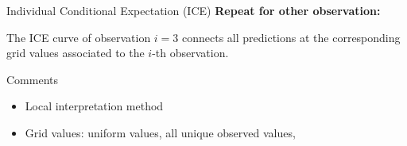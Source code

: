 \documentclass[11pt,compress,t,notes=noshow, xcolor=table]{beamer}
\begin{document}
\begin{vbframe}{Individual Conditional Expectation (ICE)}
\textbf{Repeat for other observation:}

The ICE curve of observation $i=3$ connects all predictions at the corresponding grid values associated to the $i$-th observation.
\end{vbframe}


\begin{vbframe}{Comments}
\begin{itemize}
\item Local interpretation method
\item Grid values: uniform values, all unique observed values,
\end{itemize}
\end{vbframe}

\endlecture
\end{document}
